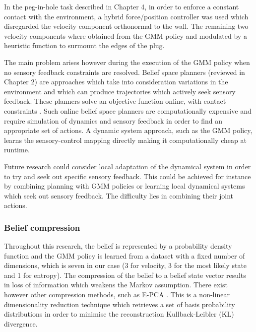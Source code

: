 In the peg-in-hole task described in Chapter 4, in order to enforce a constant contact with the environment, 
a hybrid force/position controller was used which disregarded the velocity component orthonormal to the wall.
The remaining two velocity components where obtained from the GMM policy and modulated by a heuristic 
function to surmount the edges of the plug. 

The main problem arises however during the execution of the GMM policy when no sensory feedback constraints are resolved. 
Belief space planners (reviewed in Chapter 2) are approaches which take into consideration variations in the environment 
and which can produce trajectories which actively seek sensory feedback. 
These planners solve an objective function online, with contact constraints \cite{pomdp_toussain_iros_2015}.
Such online belief space planners are computationally expensive and require simulation of dynamics and sensory 
feedback in order to find an appropriate set of actions. A dynamic system approach, such as the GMM policy, 
learns the sensory-control mapping directly making it computationally cheap at runtime.

Future research could consider local adaptation of the dynamical system in order to try
and seek out specific sensory feedback. This could be achieved for instance by combining planning with 
GMM policies or learning local dynamical systems which seek out sensory feedback. The difficulty lies
in combining their joint actions.

\subsubsection{Belief compression}
%
%
%

Throughout this research, the belief is represented by a probability density function and the GMM policy
is learned from a dataset with a fixed number of dimensions, which is seven in our case (3 for velocity, 
3 for the most likely state and 1 for entropy). The compression of the belief to a belief state vector results 
in loss of information which weakens the Markov assumption. There exist however other compression methods, such 
as E-PCA \cite{NIPS2002_2319}. This is a non-linear dimensionality reduction technique which retrieves a set of basis probability 
distributions in order to minimise the reconstruction Kullback-Leibler (KL) divergence. 

